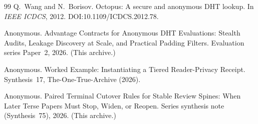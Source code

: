 \documentclass[11pt]{article}
\begin{document}
\begin{thebibliography}{99}
Q.~Wang and N.~Borisov.
\newblock Octopus: A secure and anonymous DHT lookup.
\newblock In \emph{IEEE ICDCS}, 2012.
\newblock DOI:10.1109/ICDCS.2012.78.

Anonymous.
\newblock Advantage Contracts for Anonymous DHT Evaluations: Stealth Audits, Leakage Discovery at Scale, and Practical Padding Filters.
\newblock Evaluation series Paper~2, 2026. (This archive.)

Anonymous.
\newblock Worked Example: Instantiating a Tiered Reader-Privacy Receipt.
\newblock Synthesis~17, The-One-True-Archive (2026).

Anonymous.
\newblock Paired Terminal Cutover Rules for Stable Review Spines: When Later Terse Papers Must Stop, Widen, or Reopen.
\newblock Series synthesis note (Synthesis~75), 2026. (This archive.)

\end{thebibliography}
\end{document}
